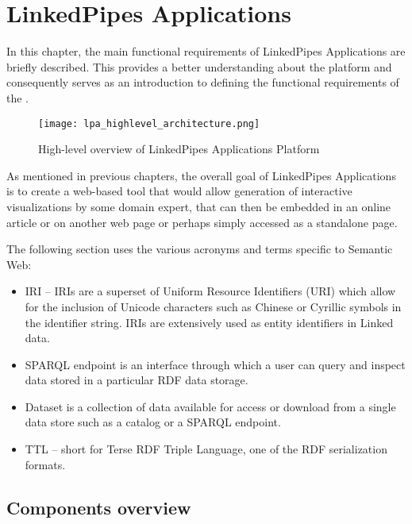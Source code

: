 \chapter{LinkedPipes Applications}
\label{chap:num_1}

In this chapter, the main functional requirements of LinkedPipes Applications are briefly described. This provides a better understanding about the platform and consequently serves as an introduction to defining the functional requirements of the \lpa{}.


\begin{figure}[h]

\centering
\texttt{[image: lpa\_highlevel\_architecture.png]}
\caption{High-level overview of LinkedPipes Applications Platform}
\label{fig:high-level-arch}
\end{figure}

As mentioned in previous chapters, the overall goal of LinkedPipes Applications is to create a web-based tool that would allow generation of interactive visualizations by some domain expert, that can then be embedded in an online article or on another web page or perhaps simply accessed as a standalone page.

The following section uses the various acronyms and terms specific to Semantic Web: 

\begin{itemize}
    \item \gls{IRI} -- IRIs are a superset of Uniform Resource Identifiers (URI) which allow for the inclusion of Unicode characters such as Chinese or Cyrillic symbols in the identifier string. IRIs are extensively used as entity identifiers in Linked data.
    \item SPARQL endpoint is an interface through which a user can query and inspect data stored in a particular RDF data storage.
    \item Dataset is a collection of data available for access or download from a single data store such as a catalog or a SPARQL endpoint.
    \item TTL -- short for Terse RDF Triple Language, one of the RDF serialization formats.
\end{itemize}

\section{Components overview}

